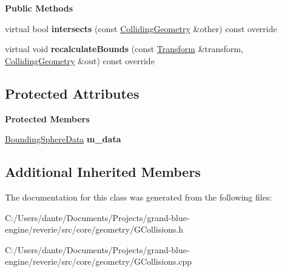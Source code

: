 \begin{Indent}\textbf{ Public Methods}\par
\begin{DoxyCompactItemize}
\item 
\mbox{\label{classrev_1_1_bounding_sphere_a4c50638928295078da816bf042706562}} 
virtual bool {\bfseries intersects} (const \mbox{\hyperlink{classrev_1_1_colliding_geometry}{Colliding\+Geometry}} \&other) const override
\item 
\mbox{\label{classrev_1_1_bounding_sphere_a97a3789887e7ba7dfe7df4727272bdff}} 
virtual void {\bfseries recalculate\+Bounds} (const \mbox{\hyperlink{classrev_1_1_transform}{Transform}} \&transform, \mbox{\hyperlink{classrev_1_1_colliding_geometry}{Colliding\+Geometry}} \&out) const override
\end{DoxyCompactItemize}
\end{Indent}
\subsection*{Protected Attributes}
\begin{Indent}\textbf{ Protected Members}\par
\begin{DoxyCompactItemize}
\item 
\mbox{\label{classrev_1_1_bounding_sphere_a50c6f7e4345b3352b4ce3a795750d329}} 
\mbox{\hyperlink{structrev_1_1_bounding_sphere_data}{Bounding\+Sphere\+Data}} {\bfseries m\+\_\+data}
\end{DoxyCompactItemize}
\end{Indent}
\subsection*{Additional Inherited Members}


The documentation for this class was generated from the following files\+:\begin{DoxyCompactItemize}
\item 
C\+:/\+Users/dante/\+Documents/\+Projects/grand-\/blue-\/engine/reverie/src/core/geometry/G\+Collisions.\+h\item 
C\+:/\+Users/dante/\+Documents/\+Projects/grand-\/blue-\/engine/reverie/src/core/geometry/G\+Collisions.\+cpp\end{DoxyCompactItemize}
